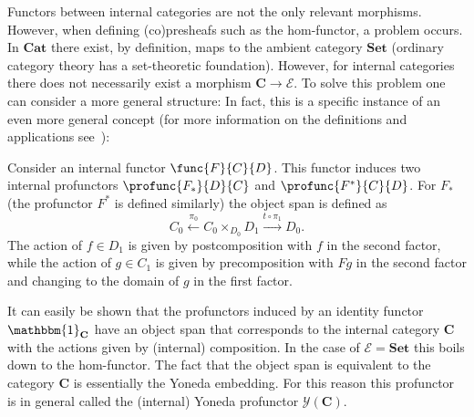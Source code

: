     Functors between internal categories are not the only relevant morphisms. However, when defining (co)presheafs such as the hom-functor, a problem occurs. In $\mathbf{Cat}$ there exist, by definition, maps to the ambient category $\mathbf{Set}$ (ordinary category theory has a set-theoretic foundation). However, for internal categories there does not necessarily exist a morphism $\mathbf{C}\rightarrow\mathcal{E}$. To solve this problem one can consider a more general structure:
    In fact, this is a specific instance of an even more general concept (for more information on the definitions and applications see~\citet{mac_lane_categories_2013, johnstone_topos_2014}):

    \begin{construct}
        Consider an internal functor $\func{F}{C}{D}$. This functor induces two internal profunctors $\profunc{F_*}{D}{C}$ and $\profunc{F^*}{C}{D}$. For $F_*$ (the profunctor $F^*$ is defined similarly) the object span is defined as \[C_0\overset{\pi_0}{\longleftarrow}C_0\times_{D_0} D_1\overset{t\circ\pi_1}{\longrightarrow}D_0.\] The action of $f\in D_1$ is given by postcomposition with $f$ in the second factor, while the action of $g\in C_1$ is given by precomposition with $Fg$ in the second factor and changing to the domain of $g$ in the first factor.

        It can easily be shown that the profunctors induced by an identity functor $\mathbbm{1}_{\mathbf{C}}$ have an object span that corresponds to the internal category $\mathbf{C}$ with the actions given by (internal) composition. In the case of $\mathcal{E}=\mathbf{Set}$ this boils down to the hom-functor. The fact that the object span is equivalent to the category $\mathbf{C}$ is essentially the Yoneda embedding. For this reason this profunctor is in general called the (internal) Yoneda profunctor $\mathcal{Y}(\mathbf{C})$.
    \end{construct}

\section{}\label{cat:higher_category_theory}

